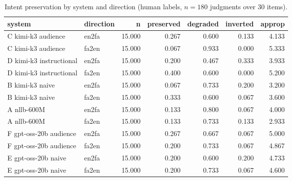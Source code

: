\begin{table}[t]
\centering
\small
\begin{tabular}{llrrrrr}
\toprule
system & direction & n & preserved & degraded & inverted & approp \\
\midrule
C kimi-k3 audience & en2fa & 15.000 & 0.267 & 0.600 & 0.133 & 4.133 \\
C kimi-k3 audience & fa2en & 15.000 & 0.067 & 0.933 & 0.000 & 5.333 \\
D kimi-k3 instructional & en2fa & 15.000 & 0.200 & 0.467 & 0.333 & 3.933 \\
D kimi-k3 instructional & fa2en & 15.000 & 0.400 & 0.600 & 0.000 & 5.200 \\
B kimi-k3 naive & en2fa & 15.000 & 0.067 & 0.733 & 0.200 & 3.200 \\
B kimi-k3 naive & fa2en & 15.000 & 0.333 & 0.600 & 0.067 & 3.600 \\
A nllb-600M & en2fa & 15.000 & 0.133 & 0.800 & 0.067 & 4.000 \\
A nllb-600M & fa2en & 15.000 & 0.133 & 0.733 & 0.133 & 2.933 \\
F gpt-oss-20b audience & en2fa & 15.000 & 0.267 & 0.667 & 0.067 & 5.000 \\
F gpt-oss-20b audience & fa2en & 15.000 & 0.200 & 0.733 & 0.067 & 4.867 \\
E gpt-oss-20b naive & en2fa & 15.000 & 0.200 & 0.600 & 0.200 & 4.733 \\
E gpt-oss-20b naive & fa2en & 15.000 & 0.200 & 0.733 & 0.067 & 4.600 \\
\bottomrule
\end{tabular}
\caption{Intent preservation by system and direction (human labels, $n=180$ judgments over 30 items).}
\label{tab:headline-human}
\end{table}

